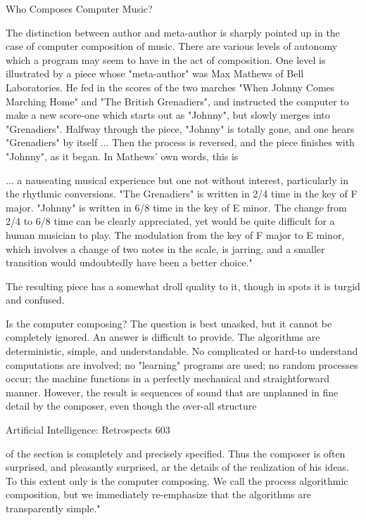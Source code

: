 {                          Who Composes Computer Music?

The distinction between author and meta-author is sharply pointed up in the case of
computer composition of music. There are various levels of autonomy which a program
may seem to have in the act of composition. One level is illustrated by a piece whose
"meta-author" was Max Mathews of Bell Laboratories. He fed in the scores of the two
marches "When Johnny Comes Marching Home" and "The British Grenadiers", and
instructed the computer to make a new score-one which starts out as "Johnny", but slowly
merges into "Grenadiers". Halfway through the piece, "Johnny" is totally gone, and one
hears "Grenadiers" by itself ... Then the process is reversed, and the piece finishes with
"Johnny", as it began. In Mathews' own words, this is

        ... a nauseating musical experience but one not without interest, particularly in
   the rhythmic conversions. "The Grenadiers" is written in 2/4 time in the key of F
   major. "Johnny" is written in 6/8 time in the key of E minor. The change from 2/4
   to 6/8 time can be clearly appreciated, yet would be quite difficult for a human
   musician to play. The modulation from the key of F major to E minor, which
   involves a change of two notes in the scale, is jarring, and a smaller transition
   would undoubtedly have been a better choice."

    The resulting piece has a somewhat droll quality to it, though in spots it is turgid and
confused.

       Is the computer composing? The question is best unasked, but it cannot be
   completely ignored. An answer is difficult to provide. The algorithms are
   deterministic, simple, and understandable. No complicated or hard-to understand
   computations are involved; no "learning" programs are used; no random processes
   occur; the machine functions in a perfectly mechanical and straightforward manner.
   However, the result is sequences of sound that are unplanned in fine detail by the
   composer, even though the over-all structure



Artificial Intelligence: Retrospects                                                    603

        of the section is completely and precisely specified. Thus the composer is often
   surprised, and pleasantly surprised, ar the details of the realization of his ideas. To
   this extent only is the computer composing. We call the process algorithmic
   composition, but we immediately re-emphasize that the algorithms are
   transparently simple."

}
